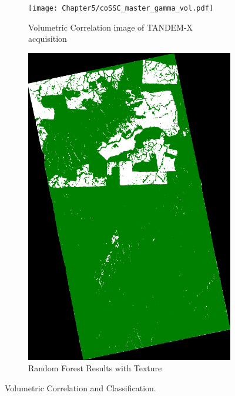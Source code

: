 \begin{figure}[H]
  \centering
  \begin{subfigure}[b]{0.4\linewidth}
    \texttt{[image: Chapter5/coSSC\_master\_gamma\_vol.pdf]}
     \caption{Volumetric Correlation image of TANDEM-X acquisition}
  \end{subfigure}
  \begin{subfigure}[b]{0.4\linewidth}
    \includegraphics[width=\linewidth]{Chapter5/TANDEM-X/classification_resultsimage.pdf}
    \caption{Random Forest Results with Texture}
  \end{subfigure}
  \caption{Volumetric Correlation and Classification.}
  \label{fig:classification_tandem}
\end{figure}

